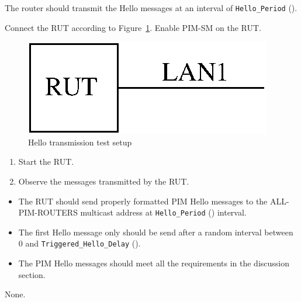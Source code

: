 \documentclass[11pt]{report}
\begin{document}
The router should transmit the Hello messages at an interval of
\verb=Hello_Period= ({\PimsmHelloPeriod}).

Connect the RUT according to Figure~\ref{fig:pim_test_2_1_hello_transmission}.
Enable PIM-SM on the RUT.

\begin{figure}[htbp]
  \begin{center}
    \includegraphics[scale=0.8]{figs/pim_test_2_1_hello_transmission}
    \caption{Hello transmission test setup}
    \label{fig:pim_test_2_1_hello_transmission}
  \end{center}
\end{figure}

\begin{enumerate}

  \item Start the RUT.

  \item Observe the messages transmitted by the RUT.

\end{enumerate}

\begin{itemize}

  \item The RUT should send properly formatted PIM Hello messages to the
        ALL-PIM-ROUTERS multicast address at \verb=Hello_Period=
        ({\PimsmHelloPeriod}) interval.

  \item The first Hello message only should be send after a random
        interval between 0 and \verb=Triggered_Hello_Delay=
        ({\PimsmTriggeredHelloDelay}).

  \item The PIM Hello messages should meet all the requirements in the
        discussion section.

\end{itemize}

None.
\end{document}
